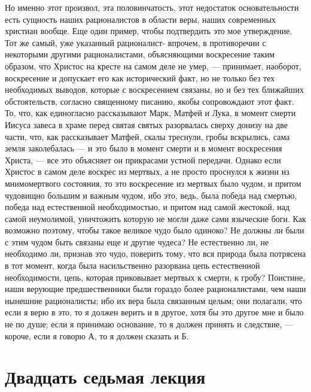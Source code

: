 \documentclass[12pt]{article}
\begin{document}
Но именно этот произвол, эта половинчатость, этот недостаток основательности есть сущность наших рационалистов в области веры, наших современных христиан вообще. Еще один пример, чтобы подтвердить это мое утверждение. Тот же самый, уже указанный рационалист- впрочем, в противоречии с некоторыми другими рационалистами, объясняющими воскресение таким образом, что Христос на кресте на самом деле не умер, --- принимает, наоборот, воскресение и допускает его как исторический факт, но не только без тех необходимых выводов, которые с воскресением связаны, но и без тех ближайших обстоятельств, согласно священному писанию, якобы сопровождают этот факт. То, что, как единогласно рассказывают Марк, Матфей и Лука, в момент смерти Иисуса завеса в храме перед святая святых разорвалась сверху донизу на две части, что, как рассказывает Матфей, скалы треснули, гробы вскрылись, сама земля заколебалась --- и это было в момент смерти и в момент воскресения Христа, --- все это объясняет он прикрасами устной передачи. Однако если Христос в самом деле воскрес из мертвых, а не просто проснулся к жизни из мнимомертвого состояния, то это воскресение из мертвых было чудом, и притом чудовищно большим и важным чудом, ибо это, ведь, была победа над смертью, победа над естественной необходимостью, и притом над самой жестокой, над самой неумолимой, уничтожить которую не могли даже сами языческие боги. Как возможно поэтому, чтобы такое великое чудо было одиноко? Не должны ли были с этим чудом быть связаны еще и другие чудеса? Не естественно ли, не необходимо ли, признав это чудо, поверить тому, что вся природа была потрясена в тот момент, когда была насильственно разорвана цепь естественной необходимости, цепь, которая приковывает мертвых к смерти, к гробу? Поистине, наши верующие предшественники были гораздо более рационалистами, чем наши нынешние рационалисты; ибо их вера была связанным целым; они полагали, что если я верю в это, то я должен верить и в другое, хотя бы это другое мне и было не по душе; если я принимаю основание, то я должен принять и следствие, --- короче, если я говорю А, то я должен сказать и Б. 

\section*{Двадцать седьмая лекция}
\end{document}
